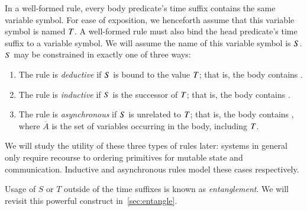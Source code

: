 %
%
In a well-formed \lang rule, every body predicate's time suffix contains the
same variable symbol.  For ease of exposition, we henceforth assume that this
variable symbol is named $\DT$.  A well-formed \lang rule must also bind the
head predicate's time suffix to a variable symbol.  We will assume the name of
this variable symbol is $\DS$.  $\DS$ may be constrained in exactly one of
three ways:

\begin{enumerate}
%
\item The rule is {\em deductive} if $\DS$ is bound to the value
$\DT$; that is, the body contains \dedalus{$\DS$ = $\DT$}.
%
\item The rule is {\em inductive} if $\DS$ is the successor of
$\DT$; that is, the body contains .
%
\item The rule is {\em asynchronous} if $\DS$ is unrelated to $\DT$;
that is, the body contains , where $\overline{A}$ is the set of variables occurring in the body,
including $\DT$.
%
\end{enumerate}

We will study the utility of these three types of rules later: systems in
general only require recourse to ordering primitives for mutable state and communication.
Inductive and asynchronous rules model these cases respectively.

Usage of $S$ or $T$ outside of the time suffixes is known as {\em
entanglement}.  We will revisit this powerful construct in~\ref{sec:entangle}. 

